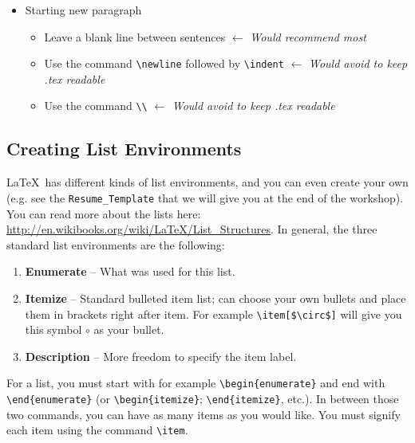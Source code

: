 \documentclass[]{article}%
\newcommand{\bs}{\textbackslash}
\newcommand{\TT}[1]{\texttt{#1}}
\newcommand{\tpc}{\textperiodcentered}
\theoremstyle{definition}
\begin{document}
\begin{itemize}
\begin{itemize}
	\end{itemize} 
	\item Starting new paragraph
	\begin{itemize}
		\item Leave a blank line between sentences $\leftarrow$ \emph{Would recommend most}
		\item Use the command \TT{\bs newline} followed by \TT{\bs indent} $\leftarrow$ \emph{Would avoid to keep .tex readable}
		\item Use the command \TT{\bs \bs} $\leftarrow$ \emph{Would avoid to keep .tex readable}
	\end{itemize}
\end{itemize}

\subsection{Creating List Environments}
\LaTeX\ has different kinds of list environments, and you can even create your own (e.g. see the \TT{Resume\_Template} that we will give you at the end of the workshop).
You can read more about the lists here: \url{http://en.wikibooks.org/wiki/LaTeX/List_Structures}.
In general, the three standard list environments are the following:
\begin{enumerate}
	\item \textbf{Enumerate} -- What was used for this list.
 	\item \textbf{Itemize} -- Standard bulleted item list; can choose your own bullets and place them in brackets right after item.
 	For example \TT{\bs item[\$\bs circ\$]} will give you this symbol $\circ$ as your bullet.
 	\item \textbf{Description} -- More freedom to specify the item label.
\end{enumerate}
For a list, you must start with for example \TT{\bs begin\{enumerate\}} and end with \TT{\bs end\{enumerate\}} (or  \TT{\bs begin\{itemize\}}; \TT{\bs end\{itemize\}}, etc.).
In between those two commands, you can have as many items as you would like.
You must signify each item using the command \TT{\bs item}.
\end{document}
